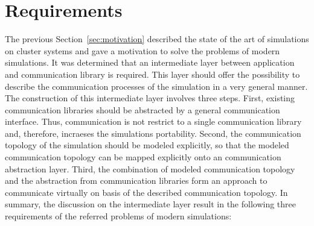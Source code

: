 


\section{Requirements}
\label{sec:requirements}

The previous Section~\ref{sec:motivation} described the state of the
art of simulations on cluster systems and gave a motivation to solve
the problems of modern simulations.
It was determined that an intermediate layer between application and
communication library is required.  This layer should offer the
possibility to describe the communication processes of the simulation
in a very general manner.  The construction of this intermediate layer
involves three steps.  First, existing communication libraries should
be abstracted by a general communication interface. Thus,
communication is not restrict to a single communication library and,
therefore, incraeses the simulations portability.  Second, the
communication topology of the simulation should be modeled explicitly,
so that the modeled communication topology can be mapped explicitly
onto an communication abstraction layer.  Third, the combination of
modeled communication topology and the abstraction from communication
libraries form an approach to communicate virtually on basis of the
described communication topology.  In summary, the discussion on the
intermediate layer result in the following three requirements of the
referred problems of modern simulations:

